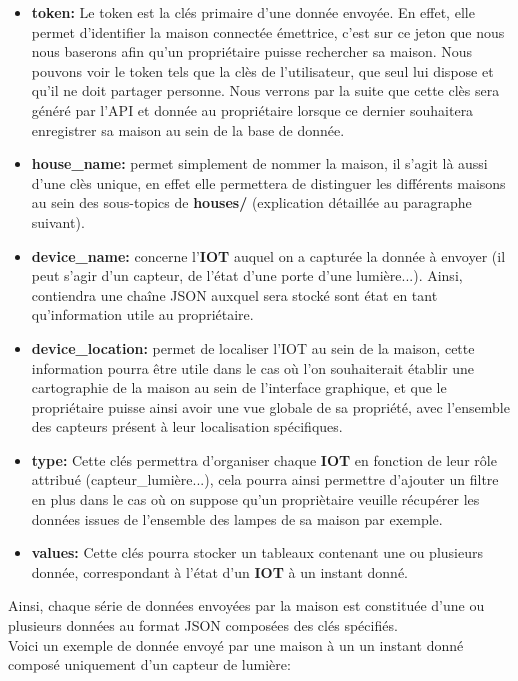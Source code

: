 \documentclass[10pt, a4paper]{report}
\begin{document}
	\begin{itemize}
		\item \textbf{token:} Le token est la clés primaire d'une donnée envoyée. En effet, elle permet d'identifier la maison connectée émettrice, c'est sur ce jeton que nous nous baserons afin qu'un propriétaire puisse rechercher sa maison. Nous pouvons voir le token tels que la clès de l'utilisateur, que seul lui dispose et qu'il ne doit partager personne. Nous verrons par la suite que cette clès sera généré par l'API et donnée au propriétaire lorsque ce dernier souhaitera enregistrer sa maison au sein de la base de donnée.
		
		\item \textbf{house\_name:} permet simplement de nommer la maison, il s'agit là aussi d'une clès unique, en effet elle permettera de distinguer les différents maisons au sein des sous-topics de \textbf{houses/} (explication détaillée au paragraphe suivant).
		
		\item \textbf{device\_name:} concerne l'\textbf{IOT} auquel on a capturée la donnée à envoyer (il peut s'agir d'un capteur, de l'état d'une porte d'une lumière...). Ainsi, contiendra une chaîne JSON auxquel sera stocké sont état en tant qu'information utile au propriétaire.
		
		\item \textbf{device\_location:} permet de localiser l'IOT au sein de la maison, cette information pourra être utile dans le cas où l'on souhaiterait établir une cartographie de la maison au sein de l'interface graphique, et que le propriétaire puisse ainsi avoir une vue globale de sa propriété, avec l'ensemble des capteurs présent à leur localisation spécifiques.
		
		\item \textbf{type:} Cette clés permettra d'organiser chaque \textbf{IOT} en fonction de leur rôle attribué (capteur\_lumière...), cela pourra ainsi permettre d'ajouter un filtre en plus dans le cas où on suppose qu'un propriètaire veuille récupérer les données issues de l'ensemble des lampes de sa maison par exemple.
		
		\item \textbf{values:} Cette clés pourra stocker un tableaux contenant une ou plusieurs donnée, correspondant à l'état d'un \textbf{IOT} à un instant donné.
	\end{itemize}
	
	Ainsi, chaque série de données envoyées par la maison est constituée d'une ou plusieurs données au format JSON composées des clés spécifiés.\\
	Voici un exemple de donnée envoyé par une maison à un un instant donné composé uniquement d'un capteur de lumière:
	
\end{document}
